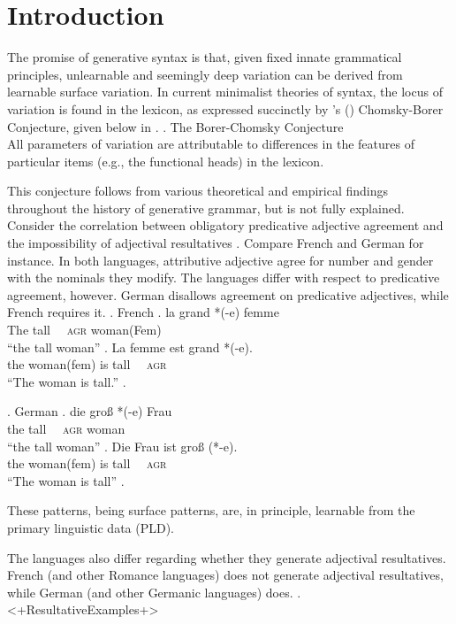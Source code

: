 \documentclass[letterpaper,12pt]{article}
\begin{document}
\section{Introduction}

The promise of generative syntax is that, given fixed innate grammatical principles, unlearnable and seemingly deep variation can be derived from learnable surface variation.
In current minimalist theories of syntax, the locus of variation is found in the lexicon, as expressed succinctly by \citeauthor{baker2008microparameter}'s (\citeyear{baker2008microparameter}) Chomsky-Borer Conjecture, given below in \Next.
\ex. The Borer-Chomsky Conjecture\\
All parameters of variation are attributable to differences in the features of particular items (e.g., the functional heads) in the lexicon. \hfill \parencite{baker2008microparameter}

This conjecture follows from various theoretical and empirical findings throughout the history of generative grammar, but is not fully explained.
Consider the correlation between obligatory predicative adjective agreement and the impossibility of adjectival resultatives \parencite{kratzer_building_2004}.
Compare French and German for instance.
In both languages, attributive adjective agree for number and gender with the nominals they modify. 
The languages differ with respect to predicative agreement, however.
German disallows agreement on predicative adjectives, while French requires it.
\ex. French 
\ag. la grand *(-e) femme\\
The tall \textsc{~~agr} woman(Fem)\\
``the tall woman''
\bg. La femme est grand *(-e).\\
the woman(fem) is tall \textsc{~~agr}\\
``The woman is tall.''
\z.

\ex. German 
\ag. die gro\ss{} *(-e) Frau\\
the tall \textsc{~~agr} woman\\
``the tall woman''
\bg. Die Frau ist gro\ss{} (*-e).\\
the woman(fem) is tall \textsc{~~agr}\\
``The woman is tall''
\z.

These patterns, being surface patterns, are, in principle, learnable from the primary linguistic data (PLD).

The languages also differ regarding whether they generate adjectival resultatives.
French (and other Romance languages) does not generate adjectival resultatives, while German (and other Germanic languages) does.
\ex. <+ResultativeExamples+> 
\end{document}
